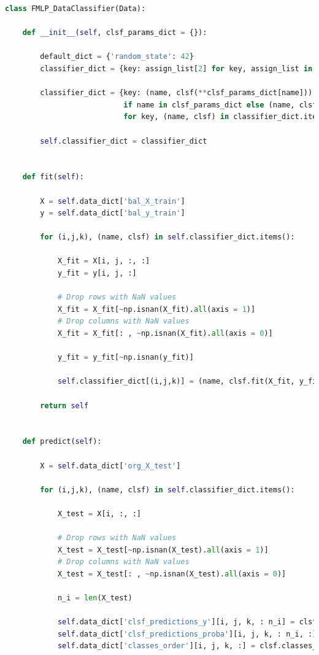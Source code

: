 \begin{lstlisting}[language=Python, numbers=none]
class FMLP_DataClassifier(Data):

    def __init__(self, clsf_params_dict = {}):

        default_dict = {'random_state': 42}
        classifier_dict = {key: assign_list[2] for key, assign_list in self.data_dict['assignment_dict'].items()}
        
        classifier_dict = {key: (name, clsf(**clsf_params_dict[name]))
                           if name in clsf_params_dict else (name, clsf(**default_dict))
                           for key, (name, clsf) in classifier_dict.items()}
        
        self.classifier_dict = classifier_dict


    def fit(self):

        X = self.data_dict['bal_X_train']
        y = self.data_dict['bal_y_train']
        
        for (i,j,k), (name, clsf) in self.classifier_dict.items():
            
            X_fit = X[i, j, :, :]
            y_fit = y[i, j, :]

            # Drop rows with NaN values
            X_fit = X_fit[~np.isnan(X_fit).all(axis = 1)]
            # Drop columns with NaN values
            X_fit = X_fit[: , ~np.isnan(X_fit).all(axis = 0)]
            
            y_fit = y_fit[~np.isnan(y_fit)]
            
            self.classifier_dict[(i,j,k)] = (name, clsf.fit(X_fit, y_fit))

        return self
    

    def predict(self):

        X = self.data_dict['org_X_test']

        for (i,j,k), (name, clsf) in self.classifier_dict.items():
            
            X_test = X[i, :, :]

            # Drop rows with NaN values
            X_test = X_test[~np.isnan(X_test).all(axis = 1)]
            # Drop columns with NaN values
            X_test = X_test[: , ~np.isnan(X_test).all(axis = 0)]

            n_i = len(X_test)

            self.data_dict['clsf_predictions_y'][i, j, k, : n_i] = clsf.predict(X_test)
            self.data_dict['clsf_predictions_proba'][i, j, k, : n_i, :] = clsf.predict_proba(X_test) 
            self.data_dict['classes_order'][i, j, k, :] = clsf.classes_

\end{lstlisting}

